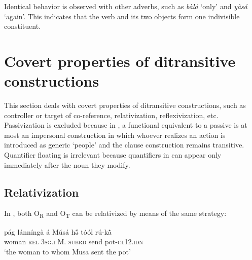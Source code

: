 \documentclass[output=paper]{langsci/langscibook}
\begin{document}
\z

\z

Identical behavior is observed with other adverbs, such as \textit{bàlá} `only' and \textit{yàsá} `again'. This indicates that the verb and its two objects form one indivisible constituent.

\section{Covert properties of ditransitive constructions}\label{§5:covert.pacchiarotti}

This section deals with covert properties of ditransitive constructions, such as controller or target of co-reference, relativization, reflexivization, etc. Passivization is excluded because in , a functional equivalent to a passive is at most an impersonal construction in which whoever realizes an action is introduced as generic `people' and the clause construction remains transitive. Quantifier floating is irrelevant because quantifiers in  can appear only immediately after the noun they modify. 

\subsection{Relativization}\label{§5.1:relativization.pacchiarotti}

In , both O\textsubscript{R}  and O\textsubscript{T}  can be relativized by means of the same strategy:

\ea
\label{ex:33.pacchiarotti}
\gll pág    lánníngà  á    Músá  hə̃́    tóól  rú-k\`{ã}\\
woman  \textsc{rel}    \textsc{3sg.i}    M.  \textsc{subrd}    send  pot-\textsc{cl12.idn}\\
\glt `the woman to whom Musa sent the pot'
\z
\end{document}
